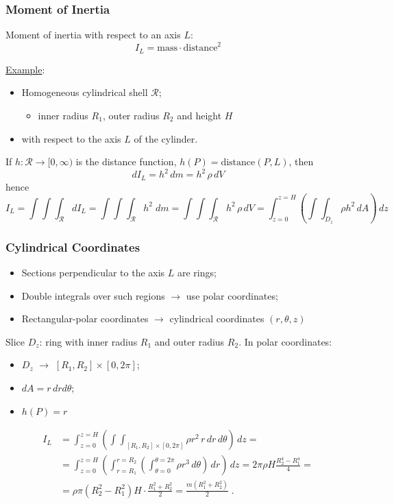\begin{frame}
  \frametitle{Moment of Inertia}

  Moment of inertia with respect to an axis $L$:
%
$$I_L = \text{mass} \cdot \text{distance}^2$$

\underline{Example}:  
\begin{itemize}
\item Homogeneous cylindrical shell $\mathcal{R}$;
\begin{itemize}
\item inner radius $R_1$, outer radius $R_2$ and height $H$
\end{itemize}
\item with respect to the axis $L$ of the cylinder.
\end{itemize}

If $h \colon \mathcal{R} \to [0,\infty)$ is the distance function, $h(P) = \text{distance}(P,L)$, then
%
$$dI_L = h^2 \, dm = h^2\, \rho \, dV$$
%
hence
%
$$I_L = \int\!\!\!\int\!\!\!\int_{\mathcal{R}} dI_L = \int\!\!\!\int\!\!\!\int_{\mathcal{R}} h^2 \; dm =\int\!\!\!\int\!\!\!\int_{\mathcal{R}} h^2 \, \rho \, dV = \int_{z=0}^{z=H} \left( \int\!\!\!\int_{D_z} \rho h^2 \, dA \right) \, dz \, $$
\end{frame}

\begin{frame}
  \frametitle{Cylindrical Coordinates}
  
%
\begin{itemize}
  \item Sections perpendicular to the axis $L$ are rings;
  \item Double integrals over such regions $\to$ use polar coordinates;
  \item Rectangular-polar coordinates $\to$ cylindrical coordinates $(r,\theta,z)$
\end{itemize}
%
Slice $D_z$: ring with inner radius $R_1$ and outer radius $R_2$. In polar coordinates:

\begin{itemize}
\item $D_z$ $\to$ $[R_1,R_2] \times [0,2\pi]$;
\item  $dA = r\, dr d\theta$;
\item $h(P) = r$
\end{itemize}

%
\begin{align*}
  I_L & = \int_{z=0}^{z=H} \left(
  \int\!\!\!\int_{[R_1,R_2] \times [0,2\pi]} \rho r^2 \, r\, dr\, d\theta \right) \, dz =\\
  & = \int_{z=0}^{z=H} \left(
  \int_{r=R_1}^{r=R_2} \left(\int_{\theta=0}^{\theta=2\pi} \rho r^3 \, d\theta \right) \, dr\right) \, dz = 2\pi \rho H \frac{R_2^4-R_1^4}{4} = \\
  &= \rho \pi (R_2^2-R_1^2)H \cdot \frac{R_1^2+R_2^2}{2} = \frac{m(R_1^2+R_2^2)}{2}\; .
\end{align*}
\end{frame}

